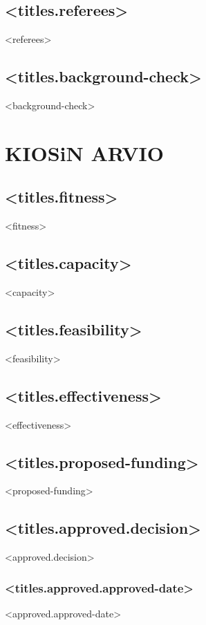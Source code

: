 \documentclass[twoside,a4paper]{article}
\begin{document}
		\subsection*{<titles.referees>}
		    <referees>
		
		\subsection*{<titles.background-check>}
		    <background-check>
		
	\newpage	
	\section{KIOSiN ARVIO}
		\subsection*{<titles.fitness>}
		    <fitness>
		
		\subsection*{<titles.capacity>}
		    <capacity>
		
		\subsection*{<titles.feasibility>}		
		    <feasibility>
		
		\subsection*{<titles.effectiveness>}	
		    <effectiveness>
		
		\subsection*{<titles.proposed-funding>}
		    <proposed-funding>
		
	    \subsection*{<titles.approved.decision>}		
			<approved.decision>
		
		\subsubsection*{<titles.approved.approved-date>}
			<approved.approved-date>
	
\end{document}
